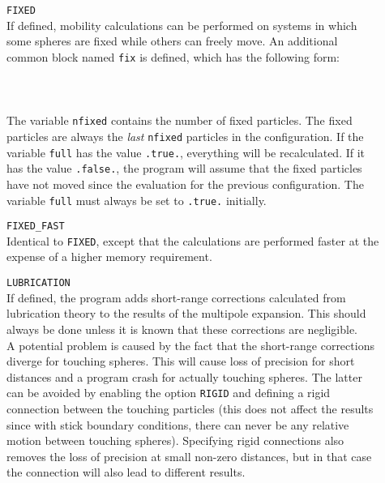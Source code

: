 \documentclass[12pt]{article}
\newcommand{\prog}[1]{{\tt #1}}
\newcommand{\wsp}{\hspace*{0.5cm}}
\begin{document}
\begin{description}
\item[]
\prog{FIXED}\\
If defined, mobility calculations can be performed on systems
in which some spheres are fixed while others can freely move.
An additional common block named \prog{fix} is defined,
which has the following form:\\
\wsp\prog{integer nfixed}\\
\wsp\prog{logical full}\\
\wsp\prog{common /fix/ nfixed,full}\\
The variable \prog{nfixed} contains the number of fixed particles.
The fixed particles are always the {\em last} \prog{nfixed}
particles in the configuration. If the variable \prog{full} has
the value \prog{.true.}, everything will be recalculated.
If it has the value \prog{.false.}, the program will assume that
the fixed particles have not moved since the evaluation for the
previous configuration. The variable \prog{full} must always be
set to \prog{.true.} initially.

\item[]
\prog{FIXED\_FAST}\\
Identical to \prog{FIXED}, except that the calculations are
performed faster at the expense of a higher memory requirement.

\item[]
\prog{LUBRICATION}\\
If defined, the program adds short-range corrections calculated from
lubrication theory to the results of the multipole
expansion. This should always be done unless it is known that these
corrections are negligible.\\
A potential problem is caused by the fact that the short-range
corrections diverge for touching spheres. This will cause loss of
precision for short distances and a program crash for actually
touching spheres. The latter can be avoided by enabling the option
\prog{RIGID} and defining a rigid connection between the touching
particles (this does not affect the results since with stick
boundary conditions, there can never be any relative motion between
touching spheres). Specifying rigid connections also removes the
loss of precision at small non-zero distances, but in that case the
connection will also lead to different results.


\end{description}
\end{document}
